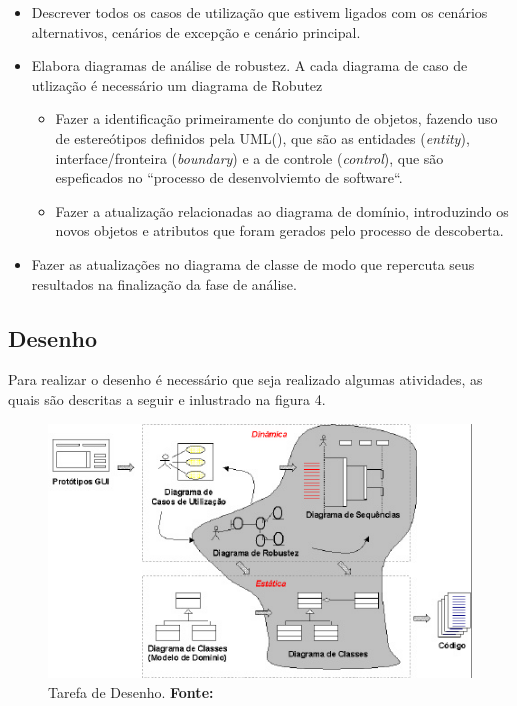 \begin{itemize}
  			\item Descrever todos os casos de utilização que estivem ligados com os
  			cenários alternativos, cenários de excepção e cenário principal.
  			\item Elabora diagramas de análise de robustez. A cada diagrama de caso de
  			utlização é necessário um diagrama de Robutez 
  			
  			\begin{itemize}
  				\item Fazer a identificação primeiramente do conjunto de objetos,
  				fazendo uso de estereótipos definidos pela UML(), que são as entidades
  				(\textit{entity}), interface/fronteira (\textit{boundary}) e a de controle
  				(\textit{control}), que são espeficados no ``processo de desenvolviemto de
  				software``.
  				\item Fazer a atualização relacionadas ao diagrama de domínio,
  				introduzindo os novos objetos e atributos que foram gerados pelo processo
  				de descoberta.			
			\end{itemize}

  			\item Fazer as atualizações no diagrama de classe de modo que repercuta
  			seus resultados na finalização da fase de análise.
\end{itemize}

\subsection{Desenho}

\par Para realizar o desenho é necessário que seja
realizado algumas atividades, as quais são descritas a seguir e inlustrado na
figura 4.

\begin{figure}[h!]
  \centerline{\includegraphics[scale=1.2]{./imagens/iconix4.png}}
  \caption[Tarefa de Desenho]
          {Tarefa de Desenho. \textbf{Fonte:}
          \cite{UML_Silva_Videira}}
\label{fig:exemplo1}
\end{figure}

